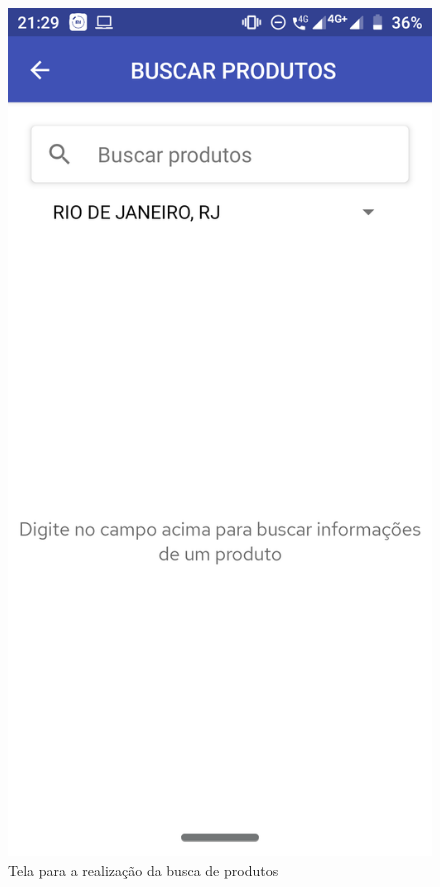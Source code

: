 \newpage
\begin{figure}[h]
    \centering
    \includegraphics[scale=0.15]{tcc/figures/app/app_buscar_produtos.png}
    \caption{Tela para a realização da busca de produtos}
    \label{appBuscaProdutosInicialFig}
\end{figure}

